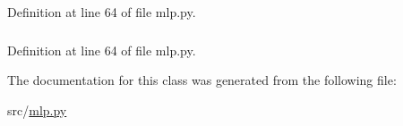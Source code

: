 Definition at line 64 of file mlp.py.

\hypertarget{classmlp_1_1mlp_a07b85e2f033556b9ef42dbc9b05011c6}{
\subsubsection[{writeweights}]{}}
\label{classmlp_1_1mlp_a07b85e2f033556b9ef42dbc9b05011c6}


Definition at line 64 of file mlp.py.



The documentation for this class was generated from the following file:\begin{DoxyCompactItemize}
\item 
src/\hyperlink{mlp_8py}{mlp.py}\end{DoxyCompactItemize}

